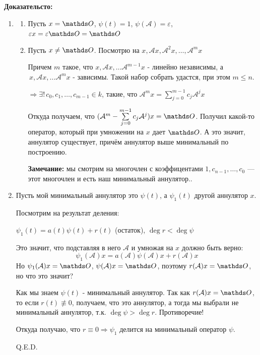 \textbf{Доказательсто:}
\begin{enumerate}
    \item 
    \begin{enumerate}
       \item Пусть $x = \zero$, $\psi(t)=1$, $\psi(\mathcal{A})=\varepsilon$,  $\varepsilon x=\varepsilon \zero = \zero$

        \item Пусть $x \ne \zero$. Посмотрю на $x, \mathcal{A}x,\mathcal{A}^2x,\ldots,\mathcal{A}^mx$

       Причем $m$ такое, что $x, \mathcal{A}x, \ldots \mathcal{A}^{m-1}x$ - линейно независимы, а $\, x, \mathcal{A}x, \ldots \mathcal{A}^{m}x$ - зависимы. Такой набор собрать удастся, при этом $m \le n$.

    $\Rightarrow  \exists! \, c_0,c_1,\ldots,c_{m-1} \in k$, такие, что $\mathcal{A}^mx = \sum\limits_{j=0}^{m-1}c_j\mathcal{A}^jx$

     Откуда получаем, что  $(\mathcal{A}^m- \sum\limits_{j=0}^{m-1}c_j\mathcal{A}^j)x= \zero$. Получил какой-то оператор, который при умножении на $x$ дает $\zero$. А это значит, аннулятор существует, причём аннулятор выше минимальный по построению.

     \textbf{Замечание:} мы смотрим на многочлен с коэффицентами $1,c_{n-1},\ldots, c_0$ --- этот многочлен и есть наш минимальный аннулятор..
     
    \end{enumerate}
    \item Пусть мой минимальный аннулятор это $\psi(t)$, а $\psi_1(t)$ другой аннулятор $x$.

    Посмотрим на результат деления:

    $\psi_1(t)=a(t) \psi(t) + r(t)$ (остаток), $\deg r < \deg \psi$

    Это значит, что подставляя в него $\mathcal{A}$ и умножая на $x$ должно быть верно:
    $$\psi_1(\mathcal{A})x = a(\mathcal{A})\psi(\mathcal{A})x+r(\mathcal{A})x$$
    Но $\psi_1(\mathcal{A})x = \zero$, $\psi(\mathcal{A})x = \zero$, поэтому $  r(\mathcal{A})x= \zero$, но что это значит?

    Как мы знаем $\psi(t)$ - минимальный аннулятор. Так как $r(\mathcal{A})x = \zero$, то если $r(t)\not \equiv 0$, получаем, что это аннулятор, а тогда мы выбрали не минимальный аннулятор, т.к. $\deg \psi> \deg r$. Противоречие!

    Откуда получаю, что $r\equiv0 \Rightarrow  \psi_1$ делится на минимальный оператор $\psi$.

    \hfill Q.E.D.

\end{enumerate}



